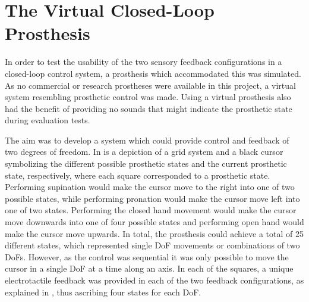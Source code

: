 
\section{The Virtual Closed-Loop Prosthesis} \label{sec:vp}

In order to test the usability of the two sensory feedback configurations in a closed-loop control system, a prosthesis which accommodated this was simulated. As no commercial or research prostheses were available in this project, a virtual system resembling prosthetic control was made. Using a virtual prosthesis also had the benefit of providing no sounds that might indicate the prosthetic state during evaluation tests.

The aim was to develop a system which could provide control and feedback of two degrees of freedom. In  is a depiction of a grid system and a black cursor symbolizing the different possible prosthetic states and the current prosthetic state, respectively, where each square corresponded to a prosthetic state. Performing supination would make the cursor move to the right into one of two possible states, while performing pronation would make the cursor move left into one of two states. Performing the closed hand movement would make the cursor move downwards into one of four possible states and performing open hand would make the cursor move upwards. In total, the prosthesis could achieve a total of 25 different states, which represented single DoF movements or combinations of two DoFs. However, as the control was sequential it was only possible to move the cursor in a single DoF at a time along an axis. In each of the squares, a unique electrotactile feedback was provided in each of the two feedback configurations, as explained in , thus ascribing four states for each DoF.      
     

